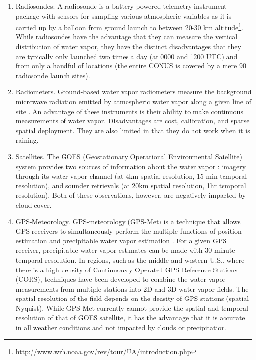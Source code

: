 \documentclass[proposal]{umassthesis}
\begin{document}
\begin{enumerate}
\item Radiosondes: A radiosonde is a battery powered telemetry instrument package with sensors for sampling various atmospheric variables as it is carried up by a balloon from ground launch to between 20-30 km altitude\footnote{http://www.wrh.noaa.gov/rev/tour/UA/introduction.php}. While radiosondes have the advantage that they can measure the vertical distribution of water vapor, they have the distinct disadvantages that they are typically only launched two times a day (at 0000 and 1200 UTC) and from only a handful of locations (the entire CONUS is covered by a mere 90 radiosonde launch sites).
\item Radiometers. Ground-based water vapor radiometers measure the background microwave radiation emitted by atmospheric water vapor along a given line of site \cite{batelaan1976development}. An advantage of these instruments is their ability to make continuous measurements of water vapor. Disadvantages are cost, calibration, and sparse spatial deployment. They are also limited in that they do not work when it is raining.
\item Satellites. The GOES (Geostationary Operational Environmental Satellite) system provides two sources of information about the water vapor \cite{forsythe2015multisensor}: imagery through its water vapor channel (at 4km spatial resolution, 15 min temporal resolution), and sounder retrievals (at 20km spatial resolution, 1hr temporal resolution). Both of these observations, however, are negatively impacted by cloud cover.
 \item GPS-Meteorology. GPS-meteorology (GPS-Met) is a technique that allows GPS receivers to simultaneously perform the multiple functions of position estimation and precipitable water vapor estimation \cite{bevis1992gps}. For a given GPS receiver, precipitable water vapor estimates can be made with 30-minute temporal resolution. In regions, such as the middle and western U.S., where there is a high density of Continuously Operated GPS Reference Stations (CORS), techniques have been developed to combine the water vapor measurements from multiple stations into 2D and 3D water vapor fields. The spatial resolution of the field depends on the density of GPS stations (spatial Nyquist). While GPS-Met currently cannot provide the spatial and temporal resolution of that of GOES satellite, it has the advantage that it is accurate in all weather conditions and not impacted by clouds or precipitation.
\end{enumerate}
\end{document}
